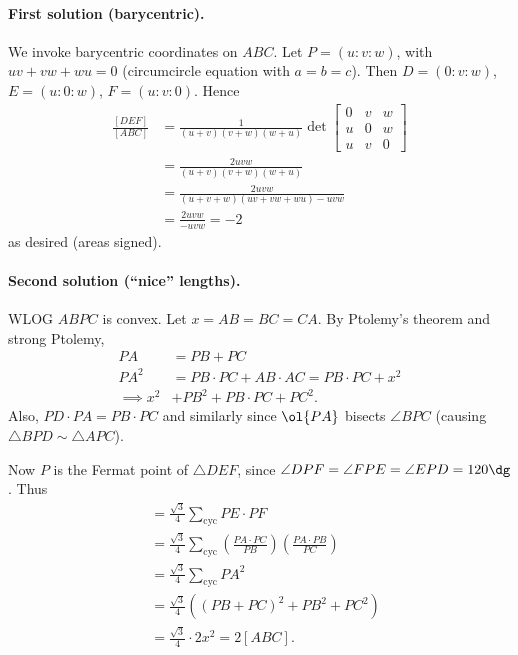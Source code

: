 \documentclass[11pt]{scrartcl}
\begin{document}
\paragraph{First solution (barycentric).}
We invoke barycentric coordinates on $ABC$.
Let $P = (u:v:w)$,
with $uv+vw+wu = 0$ (circumcircle equation with $a=b=c$).
Then $D = (0:v:w)$, $E = (u:0:w)$, $F = (u:v:0)$.
Hence
\begin{align*}
  \frac{[DEF]}{[ABC]}
  &= \frac{1}{(u+v)(v+w)(w+u)}
  \det
  \begin{bmatrix}
    0 & v & w \\
    u & 0 & w \\
    u & v & 0
  \end{bmatrix}
  \\
  &= \frac{2uvw}{(u+v)(v+w)(w+u)} \\
  &= \frac{2uvw}{(u+v+w)(uv+vw+wu)-uvw} \\
  &= \frac{2uvw}{-uvw} = -2
\end{align*}
as desired (areas signed).

\paragraph{Second solution (``nice'' lengths).}
WLOG $ABPC$ is convex.
Let $x = AB = BC = CA$.
By Ptolemy's theorem and strong Ptolemy,
\begin{align*}
  PA &= PB + PC \\
  PA^2 &= PB \cdot PC + AB \cdot AC = PB \cdot PC + x^2 \\
  \implies x^2 &+ PB^2 + PB \cdot PC + PC^2.
\end{align*}
Also, $PD \cdot PA = PB \cdot PC$ and similarly
since $\ol{PA}$ bisects $\angle BPC$
(causing $\triangle BPD \sim \triangle APC$).

Now $P$ is the Fermat point of $\triangle DEF$,
since $\angle DPF = \angle FPE = \angle EPD = 120\dg$. Thus
\begin{align*}
  [DEF] &= \frac{\sqrt3}{4} \sum_{\text{cyc}} PE \cdot PF \\
  &= \frac{\sqrt3}{4} \sum_{\text{cyc}}
  \left( \frac{PA \cdot PC}{PB} \right)
  \left( \frac{PA \cdot PB}{PC} \right) \\
  &= \frac{\sqrt3}{4} \sum_{\text{cyc}} PA^2 \\
  &= \frac{\sqrt3}{4} \left( (PB+PC)^2 + PB^2 + PC^2 \right) \\
  &= \frac{\sqrt3}{4} \cdot 2x^2 = 2[ABC].
\end{align*}
\pagebreak
\end{document}
